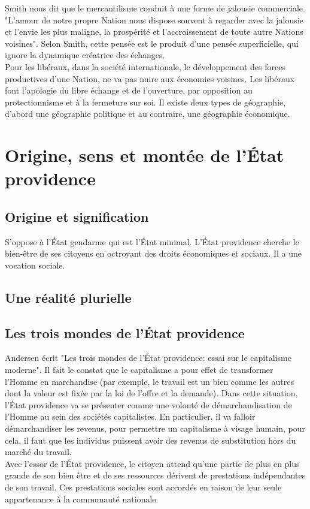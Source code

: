 \documentclass[10pt, a4paper, openany]{book}
\begin{document}
Smith nous dit que le mercantilisme conduit à une forme de jalousie commerciale. "L'amour de notre propre Nation nous dispose souvent à regarder avec la jalousie et l'envie les plus maligne, la prospérité et l'accroissement de toute autre Nations voisines". Selon Smith, cette pensée est le produit d'une pensée superficielle, qui ignore la dynamique créatrice des échanges. \\
Pour les libéraux, dans la société internationale, le développement des forces productives d'une Nation, ne va pas nuire aux économies voisines. Les libéraux font l'apologie du libre échange et de l'ouverture, par opposition au protectionnisme et à la fermeture sur soi. Il existe deux types de géographie, d'abord une géographie politique et au contraire, une géographie économique. 


\section{Origine, sens et montée de l'État providence}

\subsection{Origine et signification}

S'oppose à l'État gendarme qui est l'État minimal. L'État providence cherche le bien-être de ses citoyens en octroyant des droits économiques et sociaux. Il a une vocation sociale. 


\subsection{Une réalité plurielle}


\subsection{Les trois mondes de l'État providence}

Andersen écrit "Les trois mondes de l'État providence: essai sur le capitalisme moderne". Il fait le constat que le capitalisme a pour effet de transformer l'Homme en marchandise (par exemple, le travail est un bien comme les autres dont la valeur est fixée par la loi de l'offre et la demande). Dans cette situation, l'État providence va se présenter comme une volonté de démarchandisation de l'Homme au sein des sociétés capitalistes. En particulier, il va falloir démarchandiser les revenus, pour permettre un capitalisme à visage humain, pour cela, il faut que les individus puissent avoir des revenus de substitution hors du marché du travail.  \\
Avec l'essor de l'État providence, le citoyen attend qu'une partie de plus en plus grande de son bien être et de ses ressources dérivent de prestations indépendantes de son travail. Ces prestations sociales sont accordés en raison de leur seule appartenance à la communauté nationale. 
\end{document}
